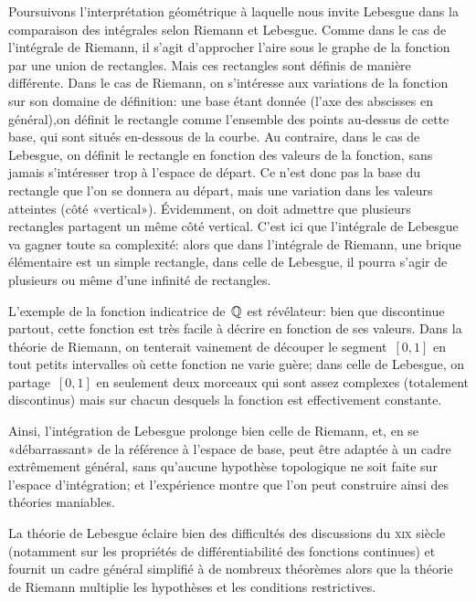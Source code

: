 \begin{histoire}
\medskip%
Poursuivons l'interprétation géométrique à laquelle nous invite Lebesgue dans la comparaison des intégrales selon Riemann et Lebesgue.
Comme dans le cas de l'intégrale de Riemann, il s'agit d'approcher l'aire sous le graphe de la fonction par une union de rectangles. Mais ces rectangles sont définis de manière différente. Dans le cas de Riemann, on s'intéresse aux variations de la fonction sur son domaine de définition: une base étant donnée (l'axe des abscisses en général),on définit le rectangle comme l'ensemble des points au-dessus de cette base, qui sont situés en-dessous de la courbe. Au contraire, dans le cas de Lebesgue, on définit le rectangle en fonction des valeurs de la fonction, sans jamais s'intéresser trop à l'espace de départ. Ce n'est donc pas la base du rectangle que l'on se donnera au départ, mais une variation dans les valeurs atteintes (côté «vertical»). Évidemment, on doit admettre que plusieurs rectangles partagent un même côté vertical. C'est ici que l'intégrale de Lebesgue va gagner toute sa complexité: alors que dans l'intégrale de Riemann, une brique élémentaire est un simple rectangle, dans celle de Lebesgue, il pourra s'agir de plusieurs ou même d'une infinité de rectangles.

L'exemple de la fonction indicatrice de~$\mathbb Q$ est révélateur: bien que discontinue partout, cette fonction est très facile à décrire en fonction de ses valeurs. Dans la théorie de Riemann, on tenterait vainement de découper le segment~$[0,1]$ en tout petits intervalles où cette fonction ne varie guère; dans celle de Lebesgue, on partage~$[0,1]$ en seulement deux morceaux qui sont assez complexes (totalement discontinus) mais sur chacun desquels la fonction est effectivement constante.

Ainsi, l'intégration de Lebesgue prolonge bien celle de Riemann, et, en se «débarrassant» de la référence à l'espace de base, peut être adaptée à un cadre extrêmement général, sans qu'aucune hypothèse topologique ne soit faite sur l'espace d'intégration; et l'expérience montre que l'on peut construire ainsi des théories maniables.

\medskip
La théorie de Lebesgue éclaire bien des difficultés des discussions du \textsc{xix} siècle (notamment sur les propriétés de différentiabilité des fonctions continues) et fournit un cadre général simplifié à de nombreux théorèmes alors que la théorie de Riemann multiplie les hypothèses et les conditions restrictives.


\end{histoire}
